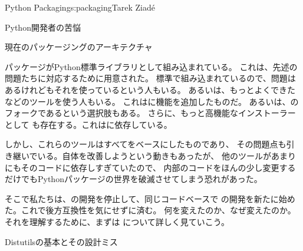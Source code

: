 \begin{aosachapter}{Python Packaging}{s:packaging}{Tarek Ziad\'{e}}
\begin{aosasect1}{Python開発者の苦悩}
\end{aosasect1}

\begin{aosasect1}{現在のパッケージングのアーキテクチャ}

パッケージがPython標準ライブラリとして組み込まれている。
これは、先述の問題たちに対応するために用意された。
標準で組み込まれているので、問題はあるけれどもそれを使っているという人もいる。
あるいは、もっとよくできたなどのツールを使う人もいる。
これはに機能を追加したものだ。
あるいは、のフォークであるという選択肢もある。
さらに、もっと高機能なインストーラーとして
も存在する。これはに依存している。

しかし、これらのツールはすべてをベースにしたものであり、
その問題点も引き継いでいる。自体を改善しようという動きもあったが、
他のツールがあまりにもそのコードに依存しすぎていたので、
内部のコードをほんの少し変更するだけでもPythonパッケージの世界を破滅させてしまう恐れがあった。

そこで私たちは、の開発を停止して、同じコードベースで
の開発を新たに始めた。これで後方互換性を気にせずに済む。
何を変えたのか、なぜ変えたのか。それを理解するために、まずは
について詳しく見ていこう。

\begin{aosasect2}{Distutilsの基本とその設計ミス}
\label{sec.packaging.flaws}


\end{aosasect2}
\end{aosasect1}
\end{aosachapter}
